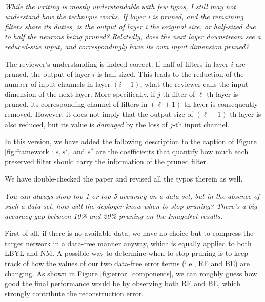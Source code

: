 
\textit{While the writing is mostly understandable with few typos, I still may not understand how the technique works. If layer i is pruned, and the remaining filters share its duties, is the output of layer i the original size, or half-sized due to half the neurons being pruned? Relatedly, does the next layer downstream see a reduced-size input, and correspondingly have its own input dimension pruned?}

The reviewer's understanding is indeed correct. If half of filters in layer $i$ are pruned, the output of layer $i$ is half-sized. This leads to the reduction of the number of input channels in layer $(i+1)$, what the reviewer calls the input dimension of the next layer. More specifically, if $j$-th filter of $\ell$-th layer is pruned, its corresponding channel of filters in $(\ell+1)$-th layer is consequently removed. However, it does not imply that the output size of $(\ell+1)$-th layer is also reduced, but its value is \textit{damaged} by the loss of $j$-th input channel.

In this version, we have added the following description to the caption of Figure \ref{fig:framework}:
$s, s',$ and $s^*$ are the coefficients that quantify how much each preserved filter should carry the information of the pruned filter.

We have double-checked the paper and revised all the typos therein as well.


\textit{You can always show top-1 or top-5 accuracy on a data set, but in the absence of such a data set, how will the deployer know when to stop pruning? There's a big accuracy gap between 10\% and 20\% pruning on the ImageNet results.}

First of all, if there is no available data, we have no choice but to compress the target network in a data-free manner anyway, which is equally applied to both LBYL and NM. A possible way to determine when to stop pruning is to keep track of how the values of our two data-free error terms (i.e., RE and BE) are changing. As shown in Figure \ref{fig:error_components}, we can roughly guess how good the final performance would be by observing both RE and BE, which strongly contribute the reconstruction error. 


